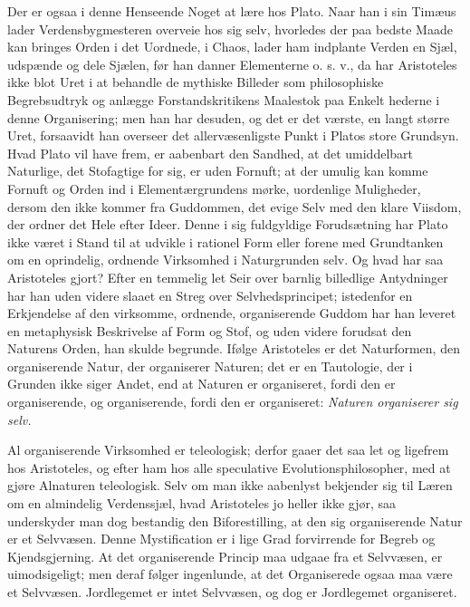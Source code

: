 \documentclass[12pt,a4paper]{book}
\begin{document}
Der er ogsaa i denne Henseende Noget at lære hos Plato. Naar han i sin Timæus
lader Verdensbygmesteren overveie hos sig selv, hvorledes der paa bedste Maade
kan bringes Orden i det Uordnede, i Chaos, lader ham indplante Verden en Sjæl,
udspænde og dele Sjælen, før han danner Elementerne o. s. v., da har Aristoteles
ikke blot Uret i at behandle de mythiske Billeder som philosophiske
Begrebsudtryk og anlægge Forstandskritikens Maalestok paa Enkelt\-%
hederne i denne Organisering; men han har desuden, og det er det værste, en
langt større Uret, forsaavidt han overseer det allervæsenligste Punkt i Platos
store Grundsyn. Hvad Plato vil have frem, er aabenbart den Sandhed, at det
umiddelbart Naturlige, det Stofagtige for sig, er uden Fornuft; at der umulig
kan komme Fornuft og Orden ind i Elementærgrundens mørke, uordenlige
Muligheder, dersom den ikke kommer fra Guddommen, det evige Selv med den klare
Viisdom, der ordner det Hele efter Ideer. Denne i sig fuldgyldige Forudsætning
har Plato ikke været i Stand til at udvikle i rationel Form eller forene med
Grundtanken om en oprindelig, ordnende Virksomhed i Naturgrunden selv. Og hvad
har saa Aristoteles gjort? Efter en temmelig let Seir over barnlig billedlige
Antydninger har han uden videre slaaet en Streg over Selvhedsprincipet;
istedenfor en Erkjendelse af den virksomme, ordnende, organiserende Guddom har
han leveret en metaphysisk Beskrivelse af Form og Stof, og uden videre forudsat
den Naturens Orden, han skulde begrunde. Ifølge Aristoteles er det
Naturformen, den organiserende Natur, der organiserer Naturen; det er en
Tautologie, der i Grunden ikke siger Andet, end at Naturen er organiseret,
fordi den er organiserende, og organiserende, fordi den er organiseret:
\emph{Naturen organiserer sig selv.}

Al organiserende Virksomhed er teleologisk; derfor gaaer det saa let og
ligefrem hos Aristoteles, og efter ham hos alle speculative
Evolutionsphilosopher, med at gjøre Alnaturen teleologisk. Selv om man ikke
aabenlyst bekjender sig til Læren om en almindelig Verdenssjæl, hvad Aristoteles
jo heller ikke gjør, saa underskyder man dog bestandig den Biforestilling, at
den sig organiserende Natur er et Selvvæsen. Denne Mystification er i lige Grad
forvirrende for Begreb og Kjendsgjerning. At det organiserende Princip maa
udgaae fra et Selvvæsen, er uimodsigeligt; men deraf
følger ingenlunde, at det Organiserede ogsaa maa være et Selvvæsen.
Jordlegemet er intet Selvvæsen, og dog er Jordlegemet organiseret.
\end{document}
